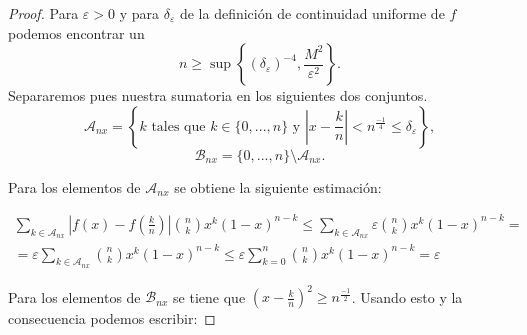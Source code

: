 \begin{proof}
    Para $\varepsilon > 0$ y para $\delta_\varepsilon$ de la definición de continuidad uniforme de $f$ 
    podemos encontrar un 
    \begin{equation} \label{eq:cota-de-la-n}
        n \geq \sup \left\{ (\delta_\varepsilon)^{-4}, \frac{M^2}{ \varepsilon^2}\right\}.
    \end{equation}
    Separaremos pues nuestra sumatoria en los siguientes dos conjuntos. 
    \begin{equation}
        \mathcal{A}_{n x} = \left\{ k \text{ tales que } k \in \{0,..., n\} \text{ y  } \left|x - \frac{k}{n}\right| < n^{\frac{-1}{4}} \leq \delta_\varepsilon \right\},
    \end{equation}
    \begin{equation}
        \mathcal{B}_{n x} = \{0,..., n\} 
        \setminus
        \mathcal{A}_{n x}. 
    \end{equation}

     Para los elementos de $\mathcal{A}_{n x}$ se obtiene la siguiente estimación: 

     \begin{equation*}
        \begin{split}
        \sum_{k \in \mathcal{A}_{n x} } \left|f(x) - f \left( \frac{k}{n} \right)\right|
     \binom{n}{k} x^{k} (1-x)^{n-k}
     \leq 
     \sum_{k \in \mathcal{A}_{n x} } \varepsilon \binom{n}{k} x^{k} (1-x)^{n-k} 
     =  \\
      = \varepsilon \sum_{k \in \mathcal{A}_{n x} }  \binom{n}{k} x^{k} (1-x)^{n-k} 
     \leq 
     \varepsilon \sum_{k = 0} ^ n  \binom{n}{k} x^{k} (1-x)^{n-k} = 
     \varepsilon
        \end{split}
    \end{equation*}

    Para los elementos de $ \mathcal{B}_{n x}$ se tiene que 
    $(x - \frac{k}{n})^2 \geq  n^{\frac{-1}{2}}$.
    Usando esto y la consecuencia  podemos escribir:
    

\end{proof}
